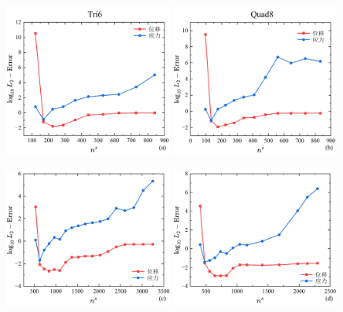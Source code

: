 \begin{figure}[H]
    \centering
    \begin{subcaptiongroup}
    \includegraphics[width=0.49\textwidth]{figures/shearlocking/T6-l2-ns8.png}
    \label{T6-l2-ns8}
    \includegraphics[width=0.49\textwidth]{figures/shearlocking/Q8-l2-ns8.png}
    \label{Q8-l2-ns8}
    \end{subcaptiongroup}
    \begin{subcaptiongroup}
    \includegraphics[width=0.49\textwidth]{figures/shearlocking/T6-l2-ns16.png}
    \label{T6-l2-ns16}
    \includegraphics[width=0.49\textwidth]{figures/shearlocking/Q8-l2-ns16.png}

\end{subcaptiongroup}
\end{figure}

